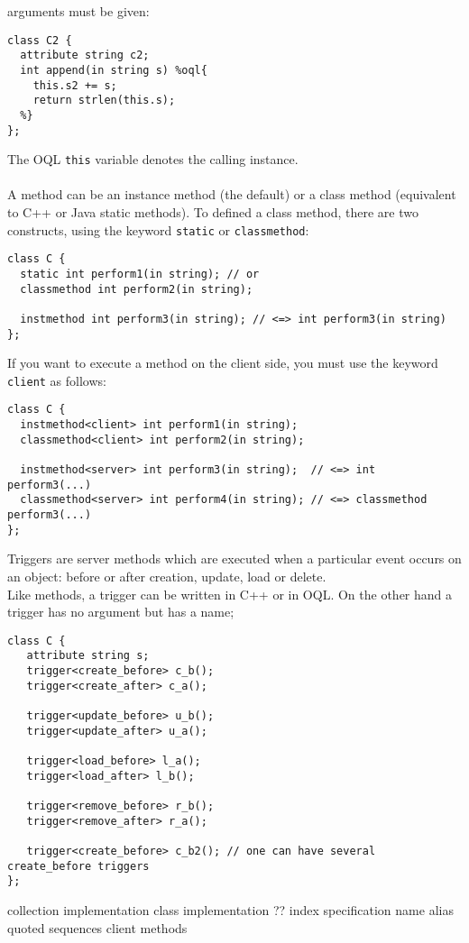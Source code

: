 arguments must be given:
\vspace{-0.2cm}
\begin{verbatim}
class C2 {
  attribute string c2;
  int append(in string s) %oql{
    this.s2 += s;
    return strlen(this.s);
  %}
};
\end{verbatim}
The OQL \texttt{this} variable denotes the calling instance.
\\
\\
A method can be an instance method (the default) or a class method (equivalent
to C++ or Java static methods). To defined a class method, there are
two constructs, using the keyword \texttt{static} or \texttt{classmethod}:
\vspace{-0.2cm}
\begin{verbatim}
class C {
  static int perform1(in string); // or
  classmethod int perform2(in string);

  instmethod int perform3(in string); // <=> int perform3(in string)
};
\end{verbatim}
If you want to execute a method on the client side, you must
use the keyword \texttt{client} as follows:
\vspace{-0.2cm}
\begin{verbatim}
class C {
  instmethod<client> int perform1(in string);
  classmethod<client> int perform2(in string);

  instmethod<server> int perform3(in string);  // <=> int perform3(...)
  classmethod<server> int perform4(in string); // <=> classmethod perform3(...)
};
\end{verbatim}

Triggers are server methods which are executed when a particular
event occurs on an object: before or after creation, update, load or delete.
\\
Like methods, a trigger can be written in C++ or in OQL. On the other
hand a trigger has no argument but has a name;
\vspace{-0.2cm}
\begin{verbatim}
class C {
   attribute string s;
   trigger<create_before> c_b();
   trigger<create_after> c_a();

   trigger<update_before> u_b();
   trigger<update_after> u_a();

   trigger<load_before> l_a();
   trigger<load_after> l_b();

   trigger<remove_before> r_b();
   trigger<remove_after> r_a();

   trigger<create_before> c_b2(); // one can have several create_before triggers
};
\end{verbatim}



  collection implementation
  class implementation ??
  index specification
  name alias
  quoted sequences
  client methods



